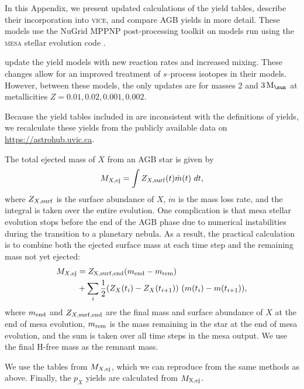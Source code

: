 \documentclass[fleqn,
usenatbib]{mnras}
\newcommand{\VICE}{\textsc{vice}}
\newcommand{\Mo}{ {\rm M}_{\sun}}
\begin{document}
In this Appendix, we present updated calculations of the \citet{battino+19, battino+21} yield tables, describe their incorporation into \VICE, and compare AGB yields in more detail. These models use the NuGrid MPPNP post-processing toolkit on models run using the \textsc{mesa} stellar evolution code \citep{mesa}.

\citet{battino+19, battino+21} update the \citet{ritter+18} yield models with new reaction rates and increased mixing. These changes allow for an improved treatment of {\it s}--process isotopes in their models. However, between these models, the only updates are for masses 2 and $3\,\Mo$ at metallicities $Z=0.01, 0.02, 0.001, 0.002$. 

Because the yield tables included in \citet{battino+19, battino+21} are inconsistent with the \citet{ritter+18} definitions of yields, we recalculate these yields from the publicly available data on \url{https://astrohub.uvic.ca}. 

The total ejected mass of $X$ from an AGB star is given by 
\begin{equation}
    M_{X, \rm ej} = \int Z_{X, \rm surf}(t) \dot{m}(t)\ dt,
\end{equation}
where $Z_{X, \rm surf}$ is the surface abundance of $X$, $\dot m$ is the mass loss rate, and the integral is taken over the entire evolution. 
One complication is that {\sc mesa} stellar evolution stops before the end of the AGB phase due to numerical instabilities during the transition to a planetary nebula. 
As a result, the practical calculation is to combine both the ejected surface mass at each time step and the remaining mass not yet ejected:  
\begin{subequations}
    \begin{align}
        M_{X, \rm ej} &= Z_{\rm X, surf, end} (m_{\rm end} - m_{\rm rem}) \\ 
                      &+ \sum_i \frac{1}{2} (Z_X(t_i) - Z_X(t_{i+1}))\ (m(t_i) - m(t_{i+1})),
    \end{align}
\end{subequations}
where $m_{\rm end}$ and $Z_{X, \rm surf, end}$ are the final mass and surface abundance of $X$ at the end of {\sc mesa} evolution, $m_{\rm rem}$ is the mass remaining in the star at the end of {\sc mesa} evolution, and the sum is taken over all time steps in the {\sc mesa} output. We use the final H-free mass as the remnant mass. 

We use the \citet{ritter+18} tables from $M_{X, \rm ej}$, which we can reproduce from the same methods as above. Finally, the $p_{X}$ yields are calculated from $M_{\rm X, ej}$. 
\end{document}
